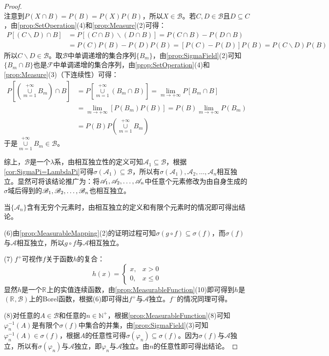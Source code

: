 \begin{proof}
\begin{equation*}
	\end{equation*}
	注意到$P(X\cap B)=P(B)=P(X)P(B)$，所以$X\in\mathscr{B}$。若$C,D\in\mathscr{B}$且$D\subseteq C$，由\cref{prop:SetOperation}(4)和\cref{prop:Measure}(2)可得：
	\begin{align*}
		P[(C\backslash D)\cap B]&=P[(C\cap B)\backslash(D\cap B)]=P(C\cap B)-P(D\cap B) \\
		&=P(C)P(B)-P(D)P(B)=[P(C)-P(D)]P(B)=P(C\backslash D)P(B)
	\end{align*}
	所以$C\backslash D\in\mathscr{B}$。取$\mathscr{B}$中单调递增的集合序列$\{B_m\}$，由\cref{prop:SigmaField}(2)可知$\{B_m\cap B\}$也是$\mathscr{F}$中单调递增的集合序列，由\cref{prop:SetOperation}(4)和\cref{prop:Measure}(3)（下连续性）可得：
	\begin{align*}
		P\left[\left(\underset{m=1}{\overset{+\infty}{\cup}}B_m\right)\cap B\right]&=P\left[\underset{m=1}{\overset{+\infty}{\cup}}(B_m\cap B)\right]=\lim_{m\to+\infty}P\left[B_m\cap B\right] \\
		&=\lim_{m\to+\infty}[P(B_m)P(B)]=P(B)\lim_{m\to+\infty}P(B_m) \\
		&=P(B)P\left(\underset{m=1}{\overset{+\infty}{\cup}}B_m\right)
	\end{align*}
	于是$\underset{m=1}{\overset{+\infty}{\cup}}B_m\in\mathscr{B}$。\par
	综上，$\mathscr{B}$是一个$\lambda$系，由相互独立性的定义可知$\mathscr{A}_1\subseteq\mathscr{B}$，根据\cref{cor:SigmaPi=LambdaPi}可得$\sigma(\mathscr{A}_1)\subseteq\mathscr{B}$，所以有$\sigma(\mathscr{A}_1),\mathscr{A}_2,\dots,\mathscr{A}_n$相互独立。显然可将该结论推广为：将$\mathscr{A}_1, \mathscr{A}_2, \dots, \mathscr{A}_{n}$中任意个元素修改为由自身生成的$\sigma$域后得到的$\mathscr{B}_1, \mathscr{B}_2, \dots, \mathscr{B}_{n}$也相互独立。\par
	当$\{\mathscr{A}_n\}$含有无穷个元素时，由相互独立的定义和有限个元素时的情况即可得出结论。\par
	(6)由\cref{prop:MeasurableMapping}(2)的证明过程可知$\sigma(g\circ f)\subseteq\sigma(f)$，而$\sigma(f)$与$\mathscr{A}$相互独立，所以$g\circ f$与$\mathscr{A}$相互独立。\par
	(7)$\;f^+$可视作$f$关于函数$h$的复合：
	\begin{equation*}
		h(x)=
		\begin{cases}
			x,&x>0 \\
			0,&x\leqslant0
		\end{cases}
	\end{equation*}
	显然$h$是一个$\mathbb{R}^{}$上的实值连续函数，由\cref{prop:MeasurableFunction}(10)即可得到$h$是$(\mathbb{R}^{},\mathcal{B})$上的Borel函数，根据(6)即可得出$f^+$与$\mathscr{A}$独立。$f^-$的情况同理可得。\par
	(8)对任意的$A\in\mathcal{B}$和任意的$n\in\mathbb{N}^+$，根据\cref{prop:MeasurableFunction}(8)可知$\varphi_n^{-1}(A)$是有限个$\sigma(f)$中集合的并集，由\cref{prop:SigmaField}(3)可知$\varphi_n^{-1}(A)\in\sigma(f)$，根据$A$的任意性可得$\sigma(\varphi_n)\subseteq\sigma(f)$。因为$\sigma(f)$与$\mathscr{A}$独立，所以有$\sigma(\varphi_n)$与$\mathscr{A}$独立，即$\varphi_n$与$\mathscr{A}$独立。由$n$的任意性即可得出结论。
\end{proof}